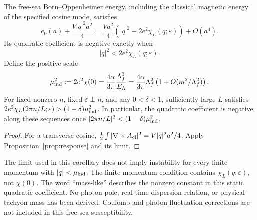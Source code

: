 \begin{corollary}
\label{cor:tachyon}
The free-sea Born--Oppenheimer energy, including the classical magnetic
energy of the specified cosine mode, satisfies
\begin{equation}
 e_0(a)+\frac{V|q|^2a^2}{4}
 =\frac{Va^2}{4}\left(|q|^2-2e^2\chi_L(q;\varepsilon)\right)+O(a^4).
 \label{eq:tachyon}
\end{equation}
Its quadratic coefficient is negative exactly when
\[
 |q|^2<2e^2\chi_L(q;\varepsilon).
\]
Define the positive scale
\begin{equation}
 \mu_{\rm ind}^2:=2e^2\chi(0)
 =\frac{4\alpha}{3\pi}\frac{\Lambda_f^3}{E_\Lambda}
 =\frac{4\alpha}{3\pi}\Lambda_f^2
   \left(1+O(m^2/\Lambda_f^2)\right).
 \label{eq:muind}
\end{equation}
For fixed nonzero \(n\), fixed \(\varepsilon\perp n\), and any
\(0<\delta<1\), sufficiently large \(L\) satisfies
\(2e^2\chi_L(2\pi n/L;\varepsilon)>(1-\delta)\mu_{\rm ind}^2\).
In particular, the quadratic coefficient is negative along these sequences
once \(|2\pi n/L|^2<(1-\delta)\mu_{\rm ind}^2\).
\end{corollary}
\begin{proof}
For a transverse cosine, \(\frac12\int|\nabla\times A_{\rm cl}|^2
=V|q|^2a^2/4\). Apply Proposition~\ref{prop:response} and its limit.
\end{proof}

The limit used in this corollary does not imply instability for every
finite momentum with \(|q|<\mu_{\rm ind}\). The finite-momentum condition
contains \(\chi_L(q;\varepsilon)\), not \(\chi(0)\). The word ``mass-like''
describes the nonzero constant in this static quadratic coefficient. No
photon pole, real-time dispersion relation, or physical tachyon mass has
been derived. Coulomb and photon fluctuation corrections are not included
in this free-sea susceptibility.

